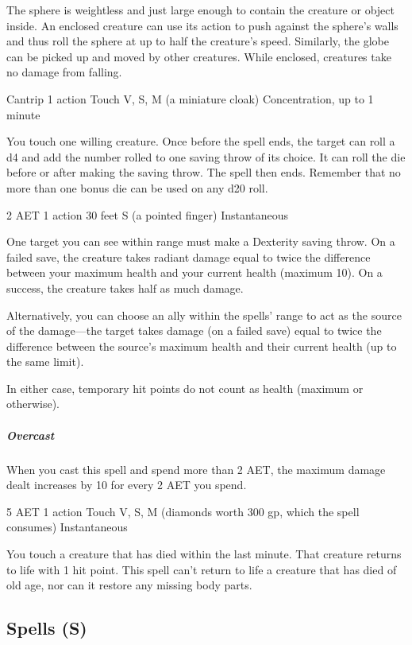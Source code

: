 The sphere is weightless and just large enough to contain the creature or object inside. An enclosed creature can use its action to push against the sphere's walls and thus roll the sphere at up to half the creature's speed. Similarly, the globe can be picked up and moved by other creatures. While enclosed, creatures take no damage from falling.


{Cantrip}
{1 action}
{Touch}
{V, S, M (a miniature cloak)}
{Concentration, up to 1 minute}

You touch one willing creature. Once before the spell ends, the target can roll a d4 and add the number rolled to one saving throw of its choice. It can roll the die before or after making the saving throw. The spell then ends. Remember that no more than one bonus die can be used on any d20 roll.

{2 AET}
{1 action}
{30 feet}
{S (a pointed finger)}
{Instantaneous}

One target you can see within range must make a Dexterity saving throw. On a failed save, the creature takes radiant damage equal to twice the difference between your maximum health and your current health (maximum 10). On a success, the creature takes half as much damage.

Alternatively, you can choose an ally within the spells' range to act as the source of the damage---the target takes damage (on a failed save) equal to twice the difference between the source's maximum health and their current health (up to the same limit).

In either case, temporary hit points do not count as health (maximum or otherwise).

\subparagraph*{Overcast} When you cast this spell and spend more than 2 AET, the maximum damage dealt increases by 10 for every 2 AET you spend.

{5 AET}
{1 action}
{Touch}
{V, S, M (diamonds worth 300 gp, which the spell consumes)}
{Instantaneous}

You touch a creature that has died within the last minute. That creature returns to life with 1 hit point. This spell can't return to life a creature that has died of old age, nor can it restore any missing body parts.

\subsection{Spells (S)}


